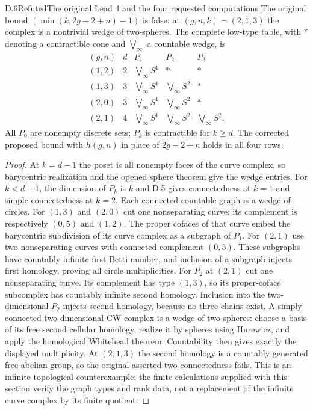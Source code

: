 \begin{result}{D.6}{Refuted}{The original Lead 4 and the four requested computations}
The original bound $(\min(k,2g-2+n)-1)$ is false: at $(g,n,k)=(2,1,3)$ the complex is a nontrivial wedge of two-spheres. The complete low-type table, with $\ast$ denoting a contractible cone and $\bigvee_\infty$ a countable wedge, is
\[
\begin{array}{c|c|c|c|c}
(g,n)&d&P_1&P_2&P_3\\\hline
(1,2)&2&\bigvee_\infty S^1&\ast&\ast\\
(1,3)&3&\bigvee_\infty S^1&\bigvee_\infty S^2&\ast\\
(2,0)&3&\bigvee_\infty S^1&\bigvee_\infty S^2&\ast\\
(2,1)&4&\bigvee_\infty S^1&\bigvee_\infty S^2&\bigvee_\infty S^2.
\end{array}
\]
All $P_0$ are nonempty discrete sets; $P_k$ is contractible for $k\geq d$. The corrected proposed bound with $h(g,n)$ in place of $2g-2+n$ holds in all four rows.
\end{result}
\begin{proof}
At $k=d-1$ the poset is all nonempty faces of the curve complex, so barycentric realization and the opened sphere theorem give the wedge entries. For $k<d-1$, the dimension of $P_k$ is $k$ and D.5 gives connectedness at $k=1$ and simple connectedness at $k=2$. Each connected countable graph is a wedge of circles. For $(1,3)$ and $(2,0)$ cut one nonseparating curve; its complement is respectively $(0,5)$ and $(1,2)$. The proper cofaces of that curve embed the barycentric subdivision of its curve complex as a subgraph of $P_1$. For $(2,1)$ use two nonseparating curves with connected complement $(0,5)$. These subgraphs have countably infinite first Betti number, and inclusion of a subgraph injects first homology, proving all circle multiplicities. For $P_2$ at $(2,1)$ cut one nonseparating curve. Its complement has type $(1,3)$, so its proper-coface subcomplex has countably infinite second homology. Inclusion into the two-dimensional $P_2$ injects second homology, because no three-chains exist. A simply connected two-dimensional CW complex is a wedge of two-spheres: choose a basis of its free second cellular homology, realize it by spheres using Hurewicz, and apply the homological Whitehead theorem. Countability then gives exactly the displayed multiplicity. At $(2,1,3)$ the second homology is a countably generated free abelian group, so the original asserted two-connectedness fails. This is an infinite topological counterexample; the finite calculations supplied with this section verify the graph types and rank data, not a replacement of the infinite curve complex by its finite quotient.
\end{proof}

